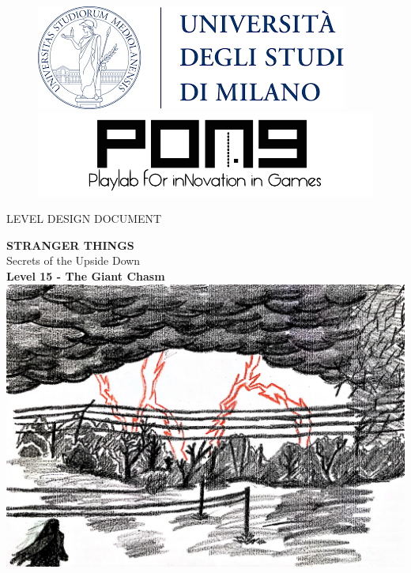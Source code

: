 \thispagestyle{empty}
{

	\begin{figure}
		\begin{minipage}{0.5\textwidth}
			\centering
			\includegraphics[width=0.6\linewidth]{images/frontespizio/unimi_logo.png}
		\end{minipage}\hfill
		\begin{minipage}{0.5\textwidth}
			\centering
			\includegraphics[width=0.6\linewidth]{images/frontespizio/pong_logo.png}
		\end{minipage}
	\end{figure}

	\vspace*{0.6cm}
	\begin{center}
		\Huge LEVEL DESIGN DOCUMENT\\
	\end{center}
	
	\vspace{2mm}
	\begin{center}
		\Huge \textbf{STRANGER THINGS}\\
		\Huge {Secrets of the Upside Down}\\
		\huge \textbf{Level 15 - The Giant Chasm}\\
		\vspace*{10mm}
		\includegraphics[width=15cm]{images/frontespizio/cover.jpg}
	\end{center}

}
